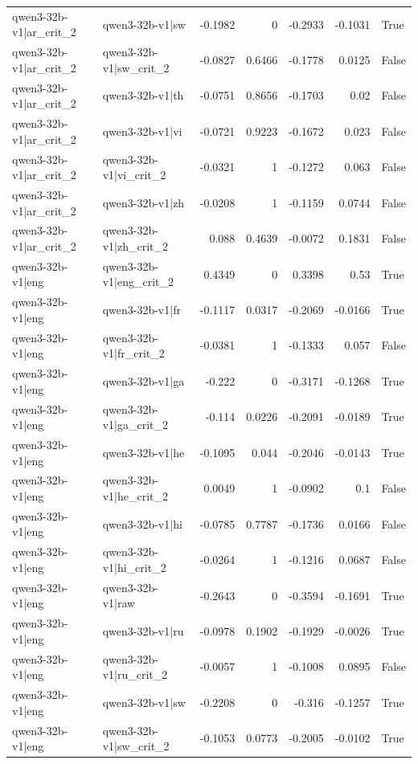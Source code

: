 \begin{table}
\begin{tabular}{l l r r r r l}
qwen3-32b-v1|ar_crit_2 & qwen3-32b-v1|sw & -0.1982 & 0 & -0.2933 & -0.1031 & True \\
qwen3-32b-v1|ar_crit_2 & qwen3-32b-v1|sw_crit_2 & -0.0827 & 0.6466 & -0.1778 & 0.0125 & False \\
qwen3-32b-v1|ar_crit_2 & qwen3-32b-v1|th & -0.0751 & 0.8656 & -0.1703 & 0.02 & False \\
qwen3-32b-v1|ar_crit_2 & qwen3-32b-v1|vi & -0.0721 & 0.9223 & -0.1672 & 0.023 & False \\
qwen3-32b-v1|ar_crit_2 & qwen3-32b-v1|vi_crit_2 & -0.0321 & 1 & -0.1272 & 0.063 & False \\
qwen3-32b-v1|ar_crit_2 & qwen3-32b-v1|zh & -0.0208 & 1 & -0.1159 & 0.0744 & False \\
qwen3-32b-v1|ar_crit_2 & qwen3-32b-v1|zh_crit_2 & 0.088 & 0.4639 & -0.0072 & 0.1831 & False \\
qwen3-32b-v1|eng & qwen3-32b-v1|eng_crit_2 & 0.4349 & 0 & 0.3398 & 0.53 & True \\
qwen3-32b-v1|eng & qwen3-32b-v1|fr & -0.1117 & 0.0317 & -0.2069 & -0.0166 & True \\
qwen3-32b-v1|eng & qwen3-32b-v1|fr_crit_2 & -0.0381 & 1 & -0.1333 & 0.057 & False \\
qwen3-32b-v1|eng & qwen3-32b-v1|ga & -0.222 & 0 & -0.3171 & -0.1268 & True \\
qwen3-32b-v1|eng & qwen3-32b-v1|ga_crit_2 & -0.114 & 0.0226 & -0.2091 & -0.0189 & True \\
qwen3-32b-v1|eng & qwen3-32b-v1|he & -0.1095 & 0.044 & -0.2046 & -0.0143 & True \\
qwen3-32b-v1|eng & qwen3-32b-v1|he_crit_2 & 0.0049 & 1 & -0.0902 & 0.1 & False \\
qwen3-32b-v1|eng & qwen3-32b-v1|hi & -0.0785 & 0.7787 & -0.1736 & 0.0166 & False \\
qwen3-32b-v1|eng & qwen3-32b-v1|hi_crit_2 & -0.0264 & 1 & -0.1216 & 0.0687 & False \\
qwen3-32b-v1|eng & qwen3-32b-v1|raw & -0.2643 & 0 & -0.3594 & -0.1691 & True \\
qwen3-32b-v1|eng & qwen3-32b-v1|ru & -0.0978 & 0.1902 & -0.1929 & -0.0026 & True \\
qwen3-32b-v1|eng & qwen3-32b-v1|ru_crit_2 & -0.0057 & 1 & -0.1008 & 0.0895 & False \\
qwen3-32b-v1|eng & qwen3-32b-v1|sw & -0.2208 & 0 & -0.316 & -0.1257 & True \\
qwen3-32b-v1|eng & qwen3-32b-v1|sw_crit_2 & -0.1053 & 0.0773 & -0.2005 & -0.0102 & True \\

\end{tabular}
\end{table}
